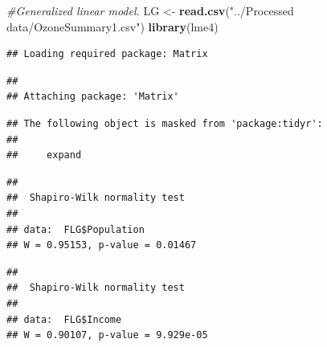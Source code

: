 \documentclass[12pt,]{article}
\newenvironment{Shaded}{\begin{snugshade}}{\end{snugshade}}
\newcommand{\KeywordTok}[1]{\textcolor[rgb]{0.13,0.29,0.53}{\textbf{#1}}}
\newcommand{\StringTok}[1]{\textcolor[rgb]{0.31,0.60,0.02}{#1}}
\newcommand{\CommentTok}[1]{\textcolor[rgb]{0.56,0.35,0.01}{\textit{#1}}}
\newcommand{\OperatorTok}[1]{\textcolor[rgb]{0.81,0.36,0.00}{\textbf{#1}}}
\newcommand{\NormalTok}[1]{#1}
\begin{document}
\pagebreak

\begin{Shaded}
\begin{Highlighting}[]
\CommentTok{#Generalized linear model.}
\NormalTok{LG <-}\StringTok{ }\KeywordTok{read.csv}\NormalTok{(}\StringTok{"../Processed data/OzoneSummary1.csv"}\NormalTok{)}
\KeywordTok{library}\NormalTok{(lme4)}
\end{Highlighting}
\end{Shaded}

\begin{verbatim}
## Loading required package: Matrix
\end{verbatim}

\begin{verbatim}
## 
## Attaching package: 'Matrix'
\end{verbatim}

\begin{verbatim}
## The following object is masked from 'package:tidyr':
## 
##     expand
\end{verbatim}

\begin{Shaded}
\end{Shaded}

\begin{verbatim}
## 
##  Shapiro-Wilk normality test
## 
## data:  FLG$Population
## W = 0.95153, p-value = 0.01467
\end{verbatim}

\begin{Shaded}
\end{Shaded}

\begin{verbatim}
## 
##  Shapiro-Wilk normality test
## 
## data:  FLG$Income
## W = 0.90107, p-value = 9.929e-05
\end{verbatim}

\begin{Shaded}
\end{Shaded}
\end{document}
